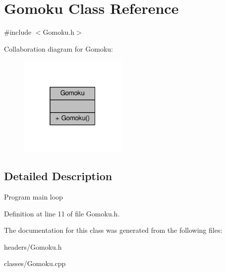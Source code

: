 \hypertarget{classGomoku}{}\section{Gomoku Class Reference}
\label{classGomoku}


{\ttfamily \#include $<$Gomoku.\+h$>$}



Collaboration diagram for Gomoku\+:
\nopagebreak
\begin{figure}[H]
\begin{center}
\leavevmode
\includegraphics[width=148pt]{classGomoku__coll__graph}
\end{center}
\end{figure}


\subsection{Detailed Description}
Program main loop 

Definition at line 11 of file Gomoku.\+h.



The documentation for this class was generated from the following files\+:\begin{DoxyCompactItemize}
\item 
headers/Gomoku.\+h\item 
classes/Gomoku.\+cpp\end{DoxyCompactItemize}
